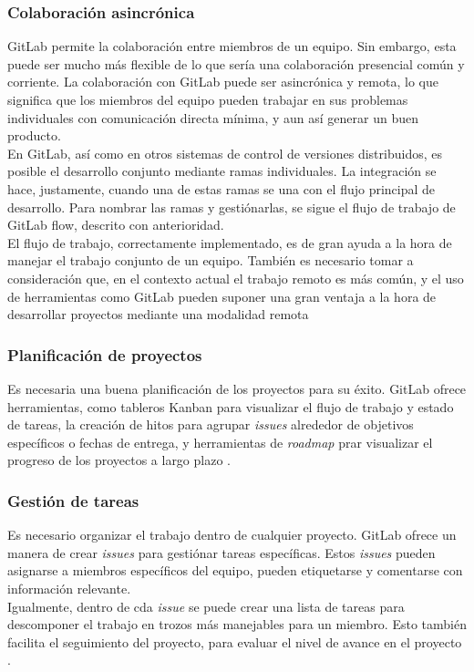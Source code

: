 \documentclass[runningheads]{llncs}
\begin{document}
\subsubsection{Colaboración asincrónica}
GitLab permite la colaboración entre miembros de un equipo. Sin embargo, esta puede ser mucho más flexible de lo que sería
una colaboración presencial común y corriente. La colaboración con GitLab puede ser asincrónica y remota, lo que significa
que los miembros del equipo pueden trabajar en sus problemas individuales con comunicación directa mínima, y aun así generar
un buen producto.\\
En GitLab, así como en otros sistemas de control de versiones distribuidos, es posible el desarrollo conjunto mediante ramas
individuales. La integración se hace, justamente, cuando una de estas ramas se una con el flujo principal de desarrollo. Para
nombrar las ramas y gestiónarlas, se sigue el flujo de trabajo de GitLab flow, descrito con anterioridad.\\
El flujo de trabajo, correctamente implementado, es de gran ayuda a la hora de manejar el trabajo conjunto de un equipo.
También es necesario tomar a consideración que, en el contexto actual el trabajo remoto es más común, y el uso de herramientas
como GitLab pueden suponer una gran ventaja a la hora de desarrollar proyectos mediante una modalidad remota \cite{choudhury2020gitlab}
\subsubsection{Planificación de proyectos}
Es necesaria una buena planificación de los proyectos para su éxito. GitLab ofrece herramientas, como tableros Kanban
para visualizar el flujo de trabajo y estado de tareas, la creación de hitos para agrupar \textit{issues} alrededor de
objetivos específicos o fechas de entrega, y herramientas de \textit{roadmap} prar visualizar el progreso de los proyectos
a largo plazo \cite{choudhury2020gitlab}.
\subsubsection{Gestión de tareas}
Es necesario organizar el trabajo dentro de cualquier proyecto. GitLab ofrece un manera de crear \textit{issues}
para gestiónar tareas específicas. Estos \textit{issues} pueden asignarse a miembros específicos del equipo, pueden
etiquetarse y comentarse con información relevante.\\
Igualmente, dentro de cda \textit{issue} se puede crear una lista de tareas para descomponer el trabajo en trozos más
manejables para un miembro. Esto también facilita el seguimiento del proyecto, para evaluar el nivel de avance en el
proyecto \cite{choudhury2020gitlab}.
\end{document}
